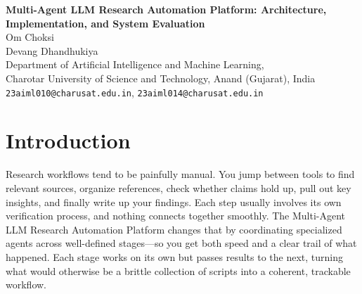 \documentclass[12pt, a4paper]{article}
\begin{document}
\begin{center}
  {\Large \textbf{Multi-Agent LLM Research Automation Platform: Architecture, Implementation, and System Evaluation}}\\[1em]
  Om Choksi\\[0.25em]
  Devang Dhandhukiya\\[0.5em]
  \small
  Department of Artificial Intelligence and Machine Learning,\\
  Charotar University of Science and Technology, Anand (Gujarat), India\\[0.3em]
  \texttt{23aiml010@charusat.edu.in}, \texttt{23aiml014@charusat.edu.in}
\end{center}

\begin{abstract}
This report presents a Multi-Agent LLM Research Automation Platform that combines Python,
Node.js, Next.js, PostgreSQL, and Redis across containerized services. The system orchestrates
research through clearly defined stages—discovery, retrieval, synthesis, critique, and
reporting—enabling reliable automation of complex investigative work. By integrating
production patterns such as workspace isolation, health monitoring, and event-driven
traceability, the platform demonstrates how thoughtful architecture supports both performance
and maintainability. Every technical claim in this report maps to verified implementation
artifacts in the codebase.

\textbf{Keywords:} Multi-Agent Systems, LangGraph, LLM Orchestration, FastAPI, Docker.
\end{abstract}

\section{Introduction}

Research workflows tend to be painfully manual. You jump between tools to find relevant sources, organize references, check whether claims hold up, pull out key insights, and finally write up your findings. Each step usually involves its own verification process, and nothing connects together smoothly. The Multi-Agent LLM Research Automation Platform changes that by coordinating specialized agents across well-defined stages—so you get both speed and a clear trail of what happened. Each stage works on its own but passes results to the next, turning what would otherwise be a brittle collection of scripts into a coherent, trackable workflow.
\end{document}
